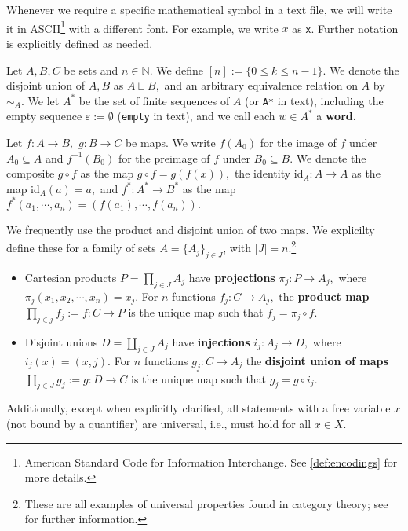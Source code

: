 Whenever we require a specific mathematical symbol in a text file, we will write it in ASCII\footnote{American Standard Code for Information Interchange. See \ref{def:encodings} for more details.} with a different font. For example, we write $x$ as \texttt{x}. Further notation is explicitly defined as needed.

Let $A, B, C$ be sets and $n \in \mathbb{N}$. We define $[n] := \{0 \leq k \leq n-1\}.$  We denote the disjoint union of $A, B$ as $A \sqcup B,$ and an arbitrary equivalence relation on $A$ by $\sim_{A}.$ We let $A^{*}$ be the set of finite sequences of $A$ (or \texttt{A*} in text), including the empty sequence $\varepsilon := \emptyset$ (\texttt{empty} in text), and we call each $w \in A^{*}$ a \textbf{word.}

Let $f: A \to B,$ $g: B \to C$ be maps. We write $f(A_{0})$ for the image of $f$ under $A_{0} \subseteq A$ and $f^{-1}(B_{0})$ for the preimage of $f$ under $B_{0} \subseteq B.$ We denote the composite $g \circ f$ as the map $g \circ f = g(f(x)),$ the identity $\mathrm{id}_{A}: A \to A$ as the map $\mathrm{id}_{A}(a) = a,$ and $f^{*}: A^{*} \to B^{*}$ as the map $f^{*}(a_{1}, \cdots, a_{n}) = (f(a_{1}), \cdots, f(a_{n})).$

We frequently use the product and disjoint union of two maps. We explicilty define these for a family of sets $A = \{A_j\}_{j \in J}$, with $|J| = n.$\footnote{These are all examples of universal properties found in category theory; see \cite{maclane} for further information.}
\begin{itemize}
\item Cartesian products $P = \prod_{j \in J}A_{j}$ have \textbf{projections} $\pi_j: P \to A_{j},$ where $\pi_j(x_{1}, x_{2}, \cdots, x_{n}) = x_{j}.$ For $n$ functions $f_{j}: C \to A_{j},$ the \textbf{product map} $\prod_{j \in j}f_{j} := f: C \to P$ is the unique map such that $f_{j} = \pi_{j} \circ f.$
  \item Disjoint unions $D = \coprod_{j \in J}A_{j}$ have \textbf{injections} $i_{j}: A_{j} \to D,$ where $i_{j}(x) = (x, j).$ For $n$ functions $g_j: C \to A_{j}$ the \textbf{disjoint union of maps} $\coprod_{j \in J}g_{j} := g: D \to C$ is the unique map such that
$g_{j} = g \circ i_{j}.$
\end{itemize}

Additionally, except when explicitly clarified, all statements with a free variable $x$ (not bound by a quantifier) are universal, i.e., must hold for all $x \in X.$

